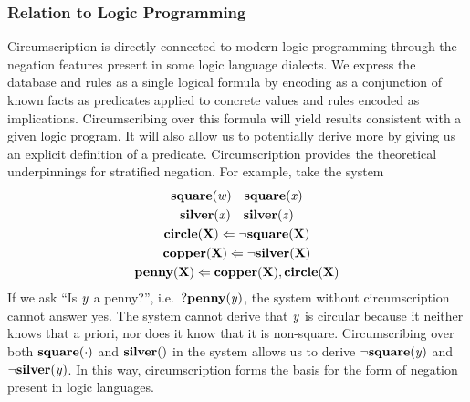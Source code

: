 \subsubsection{Relation to Logic Programming}
Circumscription is directly connected to modern logic programming through the negation features present in some logic language dialects.
We express the database and rules as a single logical formula by encoding as a conjunction of known facts as predicates applied to concrete values and rules encoded as implications.
Circumscribing over this formula will yield results consistent with a given logic program.
It will also allow us to potentially derive more by giving us an explicit definition of a predicate.
Circumscription provides the theoretical underpinnings for stratified negation.
For example, take the system
\begin{gather*}
        {\bf square}({\it w}) \quad {\bf square}({\it x})\\
        {\bf silver}({\it x}) \quad {\bf silver}({\it z})\\
        {\bf circle}({\bf X}) \Leftarrow \neg {\bf square}({\bf X})\\
        {\bf copper}({\bf X}) \Leftarrow \neg {\bf silver}({\bf X})\\
        {\bf penny}({\bf X}) \Leftarrow {\bf copper}({\bf X}), {\bf circle}({\bf X})\\
\end{gather*}
If we ask ``Is ${\it y}$ a penny?'', i.e.\ $?{\bf penny}({\it y})$, the system without circumscription cannot answer yes.
The system cannot derive that ${\it y}$ is circular because it neither knows that a priori, nor does it know that it is non-square.
Circumscribing over both ${\bf square}(\cdot)$ and $\pred{silver}$ in the system allows us to derive $\neg {\bf square}({\it y})$ and $\neg {\bf silver}({\it y})$.
In this way, circumscription forms the basis for the form of negation present in logic languages.


